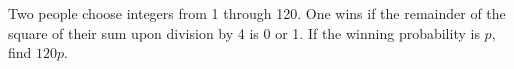 Two people choose integers from 1 through 120. One wins if the remainder of the square of their sum upon division by 4 is 0 or 1. If the winning probability is $p$, find $120p$.

